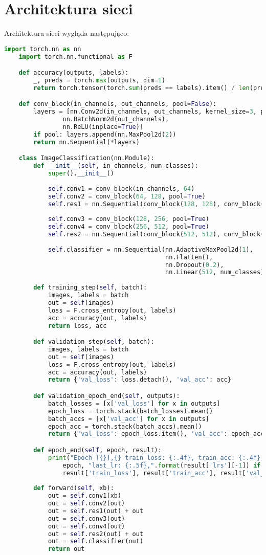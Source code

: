 \documentclass[11pt]{article}
\begin{document}
	\section{Architektura sieci}
	Architektura sieci wygląda następująco:

	\begin{lstlisting}[language=Python, caption={Implementacja sieci},captionpos=b]
	import torch.nn as nn
	import torch.nn.functional as F

	def accuracy(outputs, labels):
		_, preds = torch.max(outputs, dim=1)
		return torch.tensor(torch.sum(preds == labels).item() / len(preds))

	def conv_block(in_channels, out_channels, pool=False):
		layers = [nn.Conv2d(in_channels, out_channels, kernel_size=3, padding=1), 
				nn.BatchNorm2d(out_channels), 
				nn.ReLU(inplace=True)]
		if pool: layers.append(nn.MaxPool2d(2))
		return nn.Sequential(*layers)

	class ImageClassification(nn.Module):
		def __init__(self, in_channels, num_classes):
			super().__init__()
			
			self.conv1 = conv_block(in_channels, 64)
			self.conv2 = conv_block(64, 128, pool=True)   
			self.res1 = nn.Sequential(conv_block(128, 128), conv_block(128, 128))
			
			self.conv3 = conv_block(128, 256, pool=True)
			self.conv4 = conv_block(256, 512, pool=True)    
			self.res2 = nn.Sequential(conv_block(512, 512), conv_block(512, 512))   
			
			self.classifier = nn.Sequential(nn.AdaptiveMaxPool2d(1),
											nn.Flatten(),     
											nn.Dropout(0.2),
											nn.Linear(512, num_classes))    
			
		def training_step(self, batch):
        	images, labels = batch
        	out = self(images)
        	loss = F.cross_entropy(out, labels)
        	acc = accuracy(out, labels)
        	return loss, acc

		def validation_step(self, batch):
			images, labels = batch
			out = self(images)
			loss = F.cross_entropy(out, labels)
			acc = accuracy(out, labels)
			return {'val_loss': loss.detach(), 'val_acc': acc}

		def validation_epoch_end(self, outputs):
			batch_losses = [x['val_loss'] for x in outputs]
			epoch_loss = torch.stack(batch_losses).mean()
			batch_accs = [x['val_acc'] for x in outputs]
			epoch_acc = torch.stack(batch_accs).mean()
			return {'val_loss': epoch_loss.item(), 'val_acc': epoch_acc.item()}

		def epoch_end(self, epoch, result):
			print("Epoch [{}],{} train_loss: {:.4f}, train_acc: {:.4f}, val_loss: {:.4f}, val_acc: {:.4f}".format(
				epoch, "last_lr: {:.5f},".format(result['lrs'][-1]) if 'lrs' in result else '', 
				result['train_loss'], result['train_acc'], result['val_loss'], result['val_acc']))
			
		def forward(self, xb):
			out = self.conv1(xb)
			out = self.conv2(out)
			out = self.res1(out) + out
			out = self.conv3(out)
			out = self.conv4(out)
			out = self.res2(out) + out
			out = self.classifier(out)
			return out
	\end{lstlisting}
\end{document}
